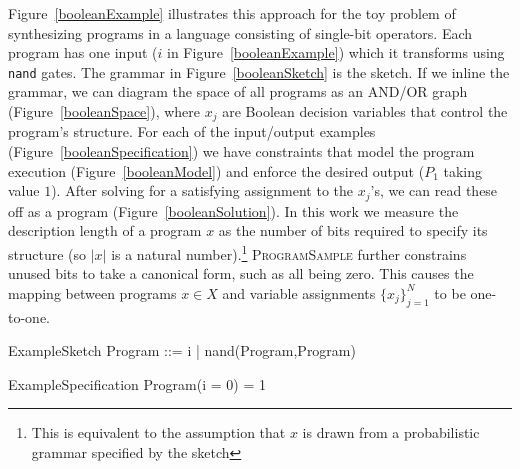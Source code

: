 \documentclass{article}
\newcommand{\theSystem}{\textsc{ProgramSample}}
\begin{document}
Figure~\ref{booleanExample} illustrates this approach for the toy
problem of synthesizing programs in a language consisting of
single-bit operators.  Each program has one input ($i$ in
Figure~\ref{booleanExample}) which it transforms using \verb|nand|
gates. The grammar in Figure~\ref{booleanSketch} is the
sketch. If we inline the grammar, we can diagram the space of all
programs as an AND/OR graph (Figure~\ref{booleanSpace}), where $x_j$ are
Boolean decision variables that control the program's structure.  For
each of the input/output examples (Figure~\ref{booleanSpecification}) we
have constraints that model the program execution
(Figure~\ref{booleanModel}) and enforce the desired output ($P_1$ taking
value $1$). After solving for a satisfying assignment to the
$x_j$'s, we can read these off as a program
(Figure~\ref{booleanSolution}).
In this work we measure the description length of a program $x$ as the
number of bits required to specify its structure (so $|x|$ is a
natural number).\footnote{This is equivalent to the assumption that
  $x$ is drawn from a probabilistic grammar specified by the sketch}
\theSystem \; further constrains unused bits to take a canonical form, such as all
being zero. This causes the mapping between programs $x\in X$ and
variable assignments $\{x_j\}_{j = 1}^N$ to be one-to-one.


\begin{SaveVerbatim}[]{ExampleSketch}
Program ::= i
| nand(Program,Program)
\end{SaveVerbatim}
\begin{SaveVerbatim}[]{ExampleSpecification}
Program(i = 0) = 1
\end{SaveVerbatim}
\end{document}
